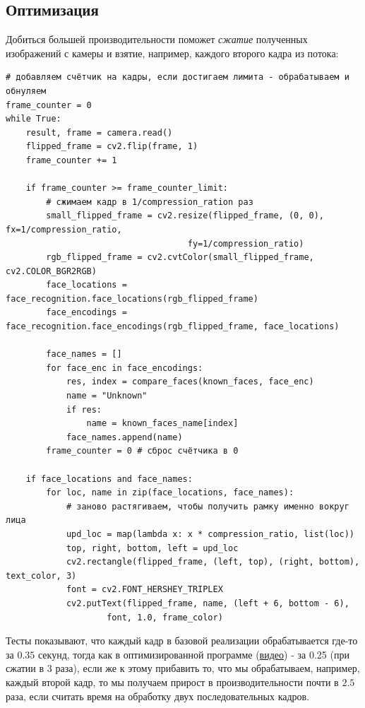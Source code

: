 \documentclass[a4paper,hidelinks,14pt]{extarticle}
\begin{document}
	\subsection{Оптимизация}
	Добиться большей производительности поможет \textit{сжатие} полученных изображений с камеры и взятие, например, каждого второго кадра из потока:
	
	\begin{verbatim}
# добавляем счётчик на кадры, если достигаем лимита - обрабатываем и обнуляем
frame_counter = 0
while True:
	result, frame = camera.read()
	flipped_frame = cv2.flip(frame, 1)
	frame_counter += 1

	if frame_counter >= frame_counter_limit:
		# сжимаем кадр в 1/compression_ration раз
		small_flipped_frame = cv2.resize(flipped_frame, (0, 0), fx=1/compression_ratio,
									fy=1/compression_ratio)
		rgb_flipped_frame = cv2.cvtColor(small_flipped_frame, cv2.COLOR_BGR2RGB)
		face_locations = face_recognition.face_locations(rgb_flipped_frame)
		face_encodings = face_recognition.face_encodings(rgb_flipped_frame, face_locations)

		face_names = []
		for face_enc in face_encodings:
			res, index = compare_faces(known_faces, face_enc)
			name = "Unknown"
			if res:
				name = known_faces_name[index]
			face_names.append(name)
		frame_counter = 0 # сброс счётчика в 0

	if face_locations and face_names:
		for loc, name in zip(face_locations, face_names):
			# заново растягиваем, чтобы получить рамку именно вокруг лица
			upd_loc = map(lambda x: x * compression_ratio, list(loc))
			top, right, bottom, left = upd_loc
			cv2.rectangle(flipped_frame, (left, top), (right, bottom), text_color, 3)
			font = cv2.FONT_HERSHEY_TRIPLEX
			cv2.putText(flipped_frame, name, (left + 6, bottom - 6),
				    font, 1.0, frame_color)
	\end{verbatim}
	
	Тесты показывают, что каждый кадр в базовой реализации обрабатывается где-то за $0.35$ секунд, тогда как в оптимизированной программе (\href{https://github.com/ventusjke/attendance_system/blob/main/practice_videos/optimized.mkv}{видео}) - за 0.25 (при сжатии в 3 раза), если же к этому прибавить то, что мы обрабатываем, например, каждый второй кадр, то мы получаем прирост в производительности почти в $2.5$ раза, если считать время на обработку двух последовательных кадров.
	
\end{document}

